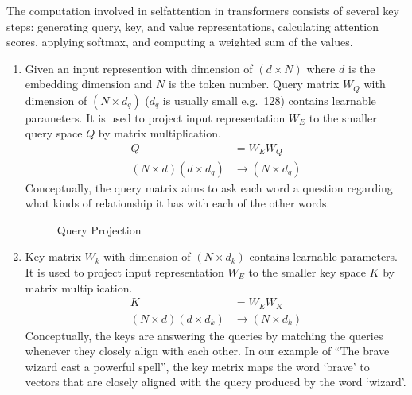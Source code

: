 \documentclass[letterpaper,11pt,english]{sphinxmanual}
\begin{document}
\begin{figure}[htbp]
\centering

\noindent{}
\end{figure}

\sphinxAtStartPar
The computation involved in self\sphinxhyphen{}attention in transformers consists of
several key steps: generating query, key, and value representations,
calculating attention scores, applying softmax, and computing a weighted
sum of the values.
\begin{enumerate}
%
\item {} 
\sphinxAtStartPar
{}

\sphinxAtStartPar
Given an input represention with dimension of \((d \times N)\)
where \(d\) is the embedding dimension and \(N\) is the token
number. Query matrix \(W_Q\) with dimension of
\((N \times d_q)\) (\(d_q\) is usually small e.g. 128)
contains learnable parameters. It is used to project input
representation \(W_E\) to the smaller query space \(Q\) by
matrix multiplication.
\begin{equation*}
\begin{split}Q &= W_E W_Q\\
(N\times d)(d\times d_q) &\rightarrow (N \times d_q)\end{split}
\end{equation*}
\sphinxAtStartPar
Conceptually, the query matrix aims to ask each word a question
regarding what kinds of relationship it has with each of the other
words.

\begin{figure}[htbp]
\centering
\capstart

\noindent{}
\caption{Query Projection}\label{\detokenize{pretraining:id14}}\end{figure}

\item {} 
\sphinxAtStartPar
{}

\sphinxAtStartPar
Key matrix \(W_k\) with dimension of \((N \times d_k)\)
contains learnable parameters. It is used to project input
representation \(W_E\) to the smaller key space \(K\) by
matrix multiplication.
\begin{equation*}
\begin{split}K &= W_E W_K \\
(N \times d) (d \times d_k) &\rightarrow (N \times d_k)\end{split}
\end{equation*}
\sphinxAtStartPar
Conceptually, the keys are answering the queries by matching the
queries whenever they closely align with each other. In our example
of “The brave wizard cast a powerful spell”, the key metrix maps the
word ‘brave’ to vectors that are closely aligned with the query
produced by the word ‘wizard’.


\end{enumerate}
\end{document}
